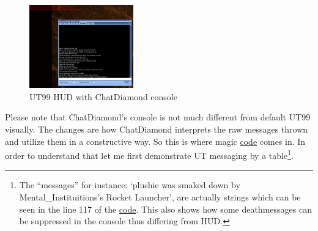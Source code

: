 \documentclass{article}
\begin{document}
\begin{figure}
\centering
\label{fig:chatdiamond_console_hud}
\includegraphics[width=0.4\textwidth]{consoleundhud}
\caption{UT99 HUD with ChatDiamond console}
\end{figure}

Please note that ChatDiamond's console is not much different from default UT99 visually.  The changes are how ChatDiamond interprets the raw messages thrown and utilize them in a constructive way. So this is where magic \href{https://github.com/ravimohan1991/ChatDiamond/blob/859323fbd80266b21c9dab163b067cacfa318463/Classes/CDUTConsole.uc#L52-L71}{code} comes in.  In order to understand that let me first demonstrate UT messaging by a table\footnote{\label{foot:hudconsolediff} The ``messages'' for instance: `plushie was smaked down by Mental\_Instituitions's Rocket Launcher', are actually strings which can be seen in the line 117 of the \href{http://uncodex.ut-files.com/UT/v436/Source_botpack/deathmessageplus.html}{code}.  This also shows how some deathmessages can be suppressed in the console thus differing from HUD.}.
\end{document}
